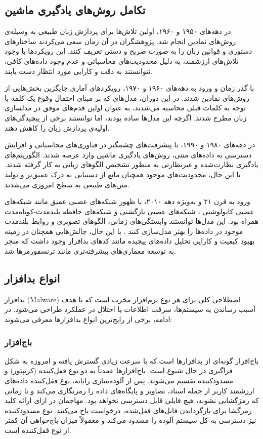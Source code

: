 \subsection{تکامل روش‌های یادگیری ماشین}
در دهه‌های ۱۹۵۰ و ۱۹۶۰، اولین تلاش‌ها برای پردازش زبان طبیعی به وسیله‌ی روش‌های نمادین انجام شد. پژوهشگران در آن زمان سعی می‌کردند ساختارهای دستوری و قوانین زبان را به صورت صریح و دستی تعریف کنند. این رویکردها با وجود تلاش‌های ارزشمند، به دلیل محدودیت‌های محاسباتی و عدم وجود داده‌های کافی، نتوانستند به دقت و کارایی مورد انتظار دست یابند.

با گذر زمان و ورود به دهه‌های ۱۹۶۰ و ۱۹۷۰، رویکردهای آماری جایگزین بخش‌هایی از روش‌های نمادین شدند. در این دوران، مدل‌های  که بر مبنای احتمال وقوع یک کلمه با توجه به کلمات قبلی محاسبه می‌شدند، به عنوان اولین قدم‌های موفق در مدلسازی زبان مطرح شدند. اگرچه این مدل‌ها ساده بودند، اما توانستند برخی از پیچیدگی‌های اولیه‌ی پردازش زبان را کاهش دهند.

در دهه‌های ۱۹۸۰ و ۱۹۹۰، با پیشرفت‌های چشمگیر در فناوری‌های محاسباتی و افزایش دسترسی به داده‌های متنی، روش‌های یادگیری ماشین وارد عرصه شدند. الگوریتم‌های یادگیری نظارت‌شده و غیرنظارتی به منظور تشخیص الگوهای زبانی به کار گرفته شدند. با این حال، محدودیت‌های موجود همچنان مانع از دستیابی به درک عمیق‌تر و تولید متن‌های طبیعی به سطح امروزی می‌شدند.

ورود به قرن ۲۱ و به‌ویژه دهه ۲۰۱۰، با ظهور شبکه‌های عصبی عمیق مانند شبکه‌های عصبی کانولوشنی
، شبکه‌های عصبی بازگشتی
 و شبکه‌های حافظه بلندمدت-کوتاه‌مدت
  همراه بود. این مدل‌ها توانستند وابستگی‌های زمانی، الگوهای تصویری و روابط بلندمدت موجود در داده‌ها را بهتر مدل‌سازی کنند \cite{Vinayakumar2019}. با این حال، چالش‌هایی همچنان در زمینه بهبود کیفیت و کارایی تحلیل داده‌های پیچیده مانند کدهای بدافزار وجود داشت که منجر به توسعه معماری‌های پیشرفته‌تری مانند ترنسفورمرها شد.

\subsection{انواع بدافزار}
بدافزار (Malware) اصطلاحی کلی برای هر نوع نرم‌افزار مخرب است که با هدف آسیب رساندن به سیستم‌ها، سرقت اطلاعات یا اختلال در عملکرد طراحی می‌شود. در ادامه، برخی از رایج‌ترین انواع بدافزارها معرفی می‌شوند:

\subsubsection{باج‌افزار}
باج‌افزار گونه‌ای از بدافزارها است که با سرعت زیادی گسترش یافته و امروزه به شکل فراگیری در حال شیوع است. باج‌افزارها عمدتاً به دو نوع قفل‌کننده (کریپتور) و مسدودکننده تقسیم می‌شوند. پس از آلوده‌سازی رایانه، نوع قفل‌کننده داده‌های ارزشمند کاربر از جمله اسناد، تصاویر و پایگاه‌های داده را رمزنگاری می‌کند و تا زمانی که رمزگشایی نشوند، هیچ فایلی قابل دسترسی نخواهد بود. مهاجمان در ازای ارائه کلید رمزگشا برای بازگرداندن فایل‌های قفل‌شده، درخواست باج می‌کنند. نوع مسدودکننده نیز دسترسی به کل سیستم آلوده را مسدود می‌کند و معمولاً میزان باج‌خواهی آن کمتر از نوع قفل‌کننده است.


